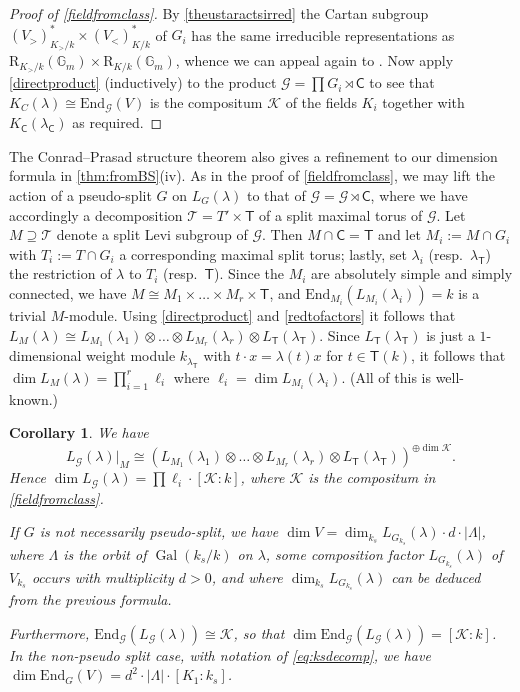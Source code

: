 \documentclass[11pt,reqno]{amsart}
\newtheorem{cor}[lemma]{Corollary}
\theoremstyle{definition}
\theoremstyle{remark}
\theoremstyle{definition}
\theoremstyle{plain}
\DeclareMathOperator{\Gal}{Gal}
\newcommand{\R}{\mathrm{R}}
\newcommand{\G}{\mathscr{G}}
\newcommand{\GG}{\mathcal{G}}
\newcommand{\TT}{\mathcal{T}}
\newcommand{\End}{\mathrm{End}}
\newcommand{\Gm}{\mathbb{G}_m}
\newcommand{\KK}{\mathcal{K}}
\newcommand{\Cs}{\mathsf{C}}
\newcommand{\Ts}{\mathsf{T}}
\begin{document}
\begin{proof}[Proof of \cref{fieldfromclass}]
By \cref{theustaractsirred} the Cartan subgroup $(V_>)^*_{K_>/k}\times (V_<)^*_{K/k}$ of $G_i$ has the same irreducible representations as $\R_{K_>/k}(\Gm)\times \R_{K/k}(\Gm)$, whence we can appeal again to \cite[Thm.~5.8]{BS22}. Now apply \cref{directproduct} (inductively) to the product $\GG=\prod G_i\rtimes\Cs$ to see that $K_C(\lambda)\cong\End_\GG(V)$ is the compositum $\KK$ of the fields $K_i$ together with $K_\Cs(\lambda_\Cs)$ as required.
\end{proof}

The Conrad--Prasad structure theorem also gives a refinement to our dimension formula in \cref{thm:fromBS}(iv). As in the proof of \cref{fieldfromclass}, we may lift the action of a pseudo-split $G$ on $L_G(\lambda)$ to that of $\GG=\G\rtimes \Cs$, where we have accordingly a decomposition $\TT=T'\times \Ts$ of a split maximal torus of $\GG$. Let $M\supseteq \TT$ denote a split Levi subgroup of $\GG$. Then $M\cap \Cs=\Ts$ and let $M_i:=M\cap G_i$ with $T_i:=T\cap G_i$ a corresponding maximal split torus; lastly, set $\lambda_i$ (resp.~$\lambda_\Ts$) the restriction of $\lambda$ to $T_i$ (resp.~$\Ts$). Since the $M_i$ are absolutely simple and simply connected, we have $M\cong M_1\times\dots\times M_r\times \Ts$, and $\End_{M_i}(L_{M_i}(\lambda_i))=k$ is a trivial $M$-module. Using \cref{directproduct} and \cref{redtofactors} it follows that $L_M(\lambda)\cong L_{M_1}(\lambda_1)\otimes\dots\otimes L_{M_r}(\lambda_r)\otimes L_{\Ts}(\lambda_{\Ts})$. Since  $L_{\Ts}(\lambda_{\Ts})$ is just a $1$-dimensional weight module $k_{\lambda_\Ts}$ with $t\cdot x=\lambda(t)x$ for $t\in \Ts(k)$, it follows that $\dim L_M(\lambda)=\prod_{i=1}^r \ell_i$ where $\ell_i=\dim L_{M_i}(\lambda_i)$. (All of this is  well-known.)
  \begin{cor}\label{cor:dimforsimples}
 We have \begin{equation}L_\GG(\lambda)|_M\cong \left(L_{M_1}(\lambda_1)\otimes\dots\otimes L_{M_r}(\lambda_r)\otimes L_{\Ts}(\lambda_\Ts)\right)^{\oplus \dim \mathcal{K}}.\label{tensorproddec}\end{equation}
Hence $\dim L_\GG(\lambda)=\prod \ell_i\cdot [\mathcal{K}:k]$, where $\mathcal{K}$ is the compositum in \cref{fieldfromclass}.

If $G$ is not necessarily pseudo-split, we have $\dim V=\dim_{k_s} L_{G_{k_s}}(\lambda)\cdot d\cdot |\Lambda|$, where $\Lambda$ is the orbit of $\Gal(k_s/k)$ on $\lambda$, some composition factor $L_{G_{k_s}}(\lambda)$ of $V_{k_s}$ occurs with multiplicity $d>0$, and where $\dim_{k_s}L_{G_{k_s}}(\lambda)$ can be deduced from the previous formula.

Furthermore, $\End_\GG(L_\GG(\lambda))\cong \mathcal{K}$, so that $\dim\End_\GG(L_\GG(\lambda))=[\mathcal{K}:k]$. In the non-pseudo split case, with notation of \cref{eq:ksdecomp}, we have $\dim \End_G(V)= d^2\cdot |\Lambda|\cdot [K_1:k_s]$.
\end{cor} 
\end{document}
